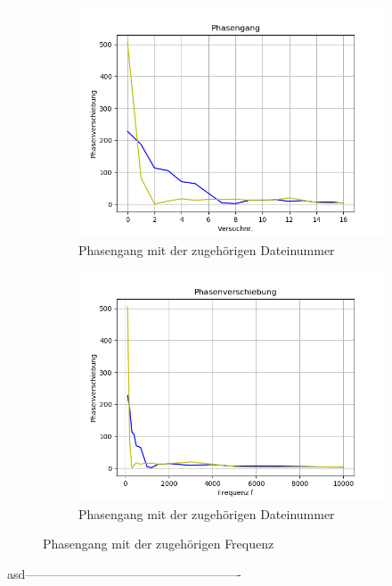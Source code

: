\documentclass[12pt, oneside, a4paper, \docLanguage]{report}
\begin{document}
\begin{figure}[H]
\centering
\begin{subfigure}{.5\textwidth}
  \centering
  \includegraphics[width=0.9\linewidth]{../data/img/phasenanzahl.png}
  \caption{Phasengang mit der zugehörigen Dateinummer}
  \label{fig:Phasengang mit der zugehörigen Dateinummer}
\end{subfigure}%
\begin{subfigure}{.5\textwidth}
  \centering
  \includegraphics[width=0.9\linewidth]{../data/img/phasenfrequenz.png}
  \caption{Phasengang mit der zugehörigen Dateinummer}
  \label{fig:Phasengang mit der zugehörigen Dateinummer}
\end{subfigure}
\caption{Phasengang mit der zugehörigen Frequenz}
\label{fig:Phasengang mit der zugehörigen Frequenz}
\end{figure}
\newpage
asd----------------------------------------------------
\end{document}
